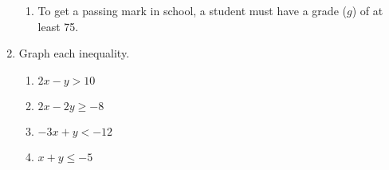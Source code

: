 \begin{enumerate}[label = \Alph*. ]
\begin{enumerate}[label = \arabic*. ]
\item To get a passing mark in
school, a student must have
a grade ($g$) of at least 75.
\end{enumerate}  

\item \hspce Graph each inequality. 
\begin{enumerate}[label = \arabic*. ]
\item \hspce $2x-y > 10$
\item \hspce $2x-2y\geq -8$
\item \hspce $-3x+y < -12$
\item \hspce $x+y \leq -5$
\end{enumerate}   
\end{enumerate}  